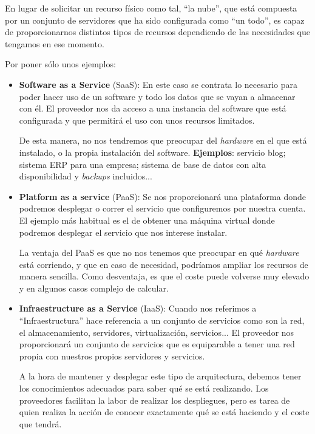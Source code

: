 En lugar de solicitar un recurso físico como tal, “la nube”, que está compuesta por un conjunto de servidores que ha sido configurada como “un todo”, es capaz de proporcionarnos distintos tipos de recursos dependiendo de las necesidades que tengamos en ese momento.

Por poner sólo unos ejemplos:

\begin{itemize}
    \item \textbf{Software as a Service} (SaaS): En este caso se contrata lo necesario para poder hacer uso de un software y todo los datos que se vayan a almacenar con él. El proveedor nos da acceso a una instancia del software que está configurada y que permitirá el uso con unos recursos limitados. 
    
    De esta manera, no nos tendremos que preocupar del \textit{hardware} en el que está instalado, o la propia instalación del software. \textbf{Ejemplos}: servicio blog; sistema ERP para una empresa; sistema de base de datos con alta disponibilidad y \textit{backups} incluidos... 

    \item \textbf{Platform as a service} (PaaS): Se nos proporcionará una plataforma donde podremos desplegar o correr el servicio que configuremos por nuestra cuenta. El ejemplo más habitual es el de obtener una máquina virtual donde podremos desplegar el servicio que nos interese instalar.
    
    La ventaja del PaaS es que no nos tenemos que preocupar en qué \textit{hardware} está corriendo, y que en caso de necesidad, podríamos ampliar los recursos de manera sencilla. Como desventaja, es que el coste puede volverse muy elevado y en algunos casos complejo de calcular.
    
    \item \textbf{Infraestructure as a Service} (IaaS): Cuando nos referimos a “Infraestructura” hace referencia a un conjunto de servicios como son la red, el almacenamiento, servidores, virtualización, servicios... El proveedor nos proporcionará un conjunto de servicios que es equiparable a tener una red propia con nuestros propios servidores y servicios.
    
    A la hora de mantener y desplegar este tipo de arquitectura, debemos tener los conocimientos adecuados para saber qué se está realizando. Los proveedores facilitan la labor de realizar los despliegues, pero es tarea de quien realiza la acción de conocer exactamente qué se está haciendo y el coste que tendrá.
\end{itemize}


